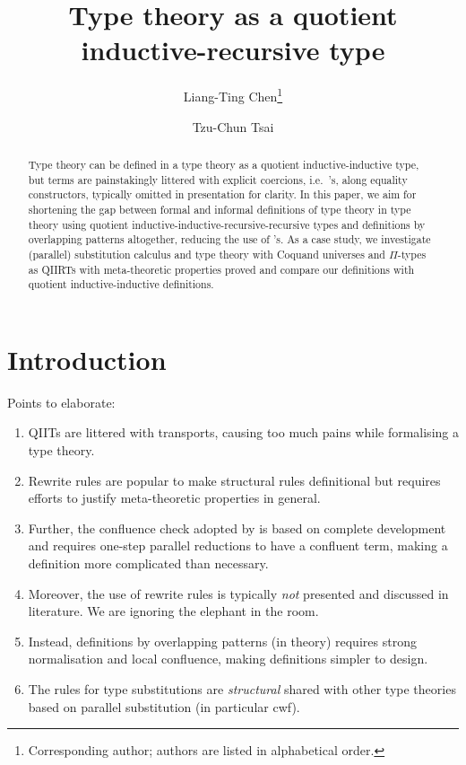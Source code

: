 \documentclass[a4paper,UKenglish,numberwithinsect,cleveref,thm-restate]{lipics-v2021}
\title{Type theory as a quotient inductive-recursive type}
\author{Liang-Ting Chen\footnote{Corresponding author; authors are listed in alphabetical order.}}{Institute of Information Science, Academia Sinica, Taiwan \and \url{http://l-tchen.github.io}}{ltchen@iis.sinica.edu.tw}{https://orcid.org/0000-0002-3250-1331}{Supported by the National Science and Technology Council of Taiwan under grant NSTC [funding].}
\author{Tzu-Chun Tsai}{Institute of Information Science, Academia Sinica, Taiwan}{gene0905@icloud.com}{}{Supported by the National Science and Technology Council of Taiwan under grant NSTC 112-2221-E-001-003-MY3.}
\begin{document}
\maketitle

\begin{abstract}
  Type theory can be defined in a type theory as a quotient inductive-inductive type, but terms are painstakingly littered with explicit coercions, i.e.\ \transp's, along equality constructors, typically omitted in presentation for clarity.
  In this paper, we aim for shortening the gap between formal and informal definitions of type theory in type theory using quotient inductive-inductive-recursive-recursive types and definitions by overlapping patterns altogether, reducing the use of \transp's.
  As a case study, we investigate (parallel) substitution calculus and type theory with Coquand universes and $\Pi$-types as QIIRTs with meta-theoretic properties proved and compare our definitions with quotient inductive-inductive definitions.
\end{abstract}

\section{Introduction} \label{sec:intro}
Points to elaborate:
\begin{enumerate}
  \item QIITs are littered with transports, causing too much pains while formalising a type theory.
  \item Rewrite rules are popular to make structural rules definitional but requires efforts to justify meta-theoretic properties in general.
  \item Further, the confluence check adopted by \Agda is based on complete development and requires one-step parallel reductions to have a confluent term, making a definition more complicated than necessary.
  \item Moreover, the use of rewrite rules is typically \emph{not} presented and discussed in literature. We are ignoring the elephant in the room.
  \item Instead, definitions by overlapping patterns (in theory) requires strong normalisation and local confluence, making definitions simpler to design.
  \item The rules for type substitutions are \emph{structural} shared with other type theories based on parallel substitution (in particular cwf).
  
\end{enumerate}
\end{document}
